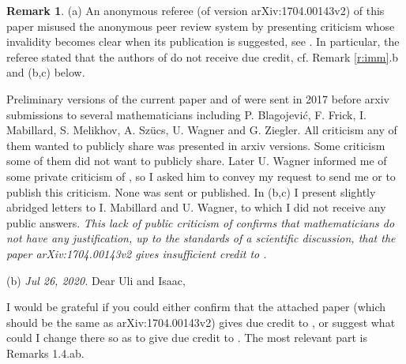 \documentclass[12pt]{article}
\theoremstyle{plain}
\theoremstyle{definition}
\newtheorem{Remark}[Theorem]{Remark}
\begin{document}
{%

\endcomment


\begin{Remark}\label{r:uwn}
(a)  An anonymous referee (of version arXiv:1704.00143v2) of this paper misused the anonymous peer review system by presenting criticism whose invalidity becomes clear when its publication is suggested, see \cite[\S6]{Sk21d}.
In particular, the referee stated that the authors of \cite{MW16} do not receive due credit, cf. Remark \ref{r:imm}.b and (b,c) below.

Preliminary versions of the current paper and of \cite{Sk17o} were sent in 2017 before arxiv submissions to
several mathematicians including P. Blagojevi{\'c}, F. Frick, I. Mabillard, S. Melikhov, A. Sz\"ucs, U. Wagner and G. Ziegler.
All criticism any of them wanted to publicly share was presented in arxiv versions.
Some criticism some of them did not want to publicly share.
Later U. Wagner informed me of some private criticism of \cite{Sk17o},
so I asked him to convey my request to send me or to publish this criticism.
None was sent or published.
In (b,c) I present slightly abridged letters to I. Mabillard and U. Wagner,
to which I did not receive any public answers.
{\it This lack of public criticism of \cite{Sk17o} confirms that mathematicians do not have any justification,
up to the standards of a scientific discussion, that the paper arXiv:1704.00143v2 gives insufficient credit to \cite{MW16}.}

(b) {\it Jul 26, 2020.} Dear Uli and Isaac,

I would be grateful if you could either confirm that the attached paper
(which should be the same as arXiv:1704.00143v2) gives due credit to \cite{MW16},
or suggest what could I change there so as to give due credit to \cite{MW16}.
The most relevant part is Remarks 1.4.ab.


\end{Remark}}
\end{document}
